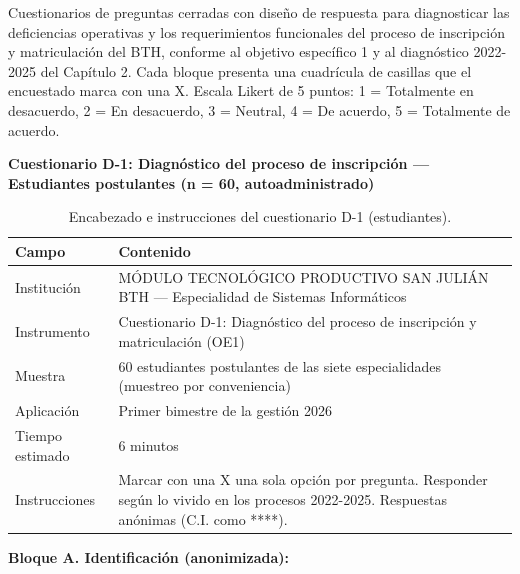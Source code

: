
\providecommand{\casilla}{\framebox[0.38cm]{\rule{0pt}{0.33cm}}}

Cuestionarios de preguntas cerradas con diseño de respuesta para diagnosticar las deficiencias operativas y los requerimientos funcionales del proceso de inscripción y matriculación del BTH, conforme al objetivo específico 1 y al diagnóstico 2022-2025 del Capítulo 2. Cada bloque presenta una cuadrícula de casillas que el encuestado marca con una X. Escala Likert de 5 puntos: 1 = Totalmente en desacuerdo, 2 = En desacuerdo, 3 = Neutral, 4 = De acuerdo, 5 = Totalmente de acuerdo.

\noindent\textbf{Cuestionario D-1: Diagnóstico del proceso de inscripción --- Estudiantes postulantes (n = 60, autoadministrado)}

\begin{table}[htbp]
    \centering
    \caption{Encabezado e instrucciones del cuestionario D-1 (estudiantes).}
    \label{tab:d1_encabezado}
    \begin{tabularx}{\textwidth}{p{} X}
        \toprule
        \textbf{Campo} & \textbf{Contenido} \\
        \midrule
        Institución & MÓDULO TECNOLÓGICO PRODUCTIVO SAN JULIÁN BTH --- Especialidad de Sistemas Informáticos \\
        Instrumento & Cuestionario D-1: Diagnóstico del proceso de inscripción y matriculación (OE1) \\
        Muestra & 60 estudiantes postulantes de las siete especialidades (muestreo por conveniencia) \\
        Aplicación & Primer bimestre de la gestión 2026 \\
        Tiempo estimado & 6 minutos \\
        Instrucciones & Marcar con una X una sola opción por pregunta. Responder según lo vivido en los procesos 2022-2025. Respuestas anónimas (C.I. como ****). \\
        \bottomrule
    \end{tabularx}
\end{table}

\noindent\textbf{Bloque A. Identificación (anonimizada):}

